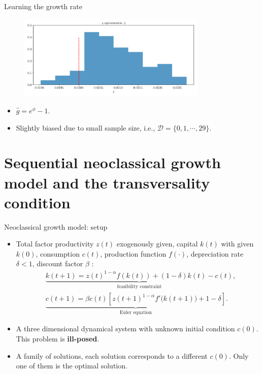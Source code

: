 \documentclass[aspectratio=169,10pt]{beamer}
\newcommand{\emphcolor}[1]{\textbf{\textcolor{emphcolorval}{#1}}}
\begin{document}
\begin{frame}[label= growing-dividends]{Learning the growth rate}
	
	\begin{figure}[htb]
		\centering
		\includegraphics[width=9cm]{figs/asset_pricing_sequential_g_histogram.pdf}
	\end{figure}
	
	\begin{itemize}
		\item $\hat{g} = e^\phi -1$.
		\item Slightly biased due to small sample size, i.e., $\mathcal{D} = \{0,1,\cdots,29\}$.
	\end{itemize}

\end{frame}


\section{\textcolor{PennBlue}{Sequential neoclassical growth model and the transversality condition }}


\begin{frame}{Neoclassical growth model: setup }
	\begin{itemize}
		\item Total factor productivity $z(t)$ exogenously given, capital $k(t)$ with given $k(0)$, consumption $c(t)$, production function $f(\cdot)$, depreciation rate $\delta<1$, discount factor $\beta$  :
		\begin{align*}
			&\underbrace{k(t+1) = z(t)^{1-\alpha} f\left(k(t)\right)+ (1-\delta)k(t)-c(t)}_{\text{feasibility constraint}}, \\ 
			&\underbrace{c(t+1) = \beta c(t) \left[z(t+1)^{1-\alpha}f'\big(k(t+1)\big)+1-\delta\right]}_{\text{Euler equation}}.
		\end{align*}
	\item A three dimensional dynamical system with unknown initial condition  $c(0)$. This problem is \emphcolor{ill-posed}.
	\vspace{0.05in}
	\item A family of solutions, each solution corresponds to a different $c(0)$. Only one of them is the optimal solution.
	\end{itemize}	
\end{frame}
\end{document}
